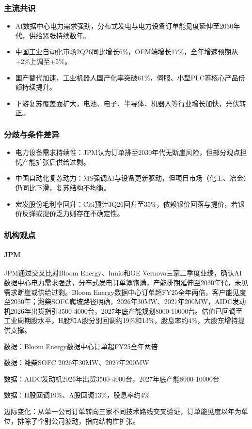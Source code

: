 \documentclass[11pt]{ctexart}
\begin{document}
\subsubsection*{主流共识}
\begin{itemize}
  \item AI数据中心电力需求强劲，分布式发电与电力设备订单能见度延伸至2030年代，供给紧张持续数年。
  \item 中国工业自动化市场2Q26同比增长6\%，OEM端增长17\%，全年增速预期从+2\%上调至+5\%。
  \item 国产替代加速，工业机器人国产化率突破61\%，伺服、小型PLC等核心产品份额持续提升。
  \item 下游复苏覆盖面扩大，电池、电子、半导体、机器人等行业增长加快，光伏转正。
\end{itemize}
\subsubsection*{分歧与条件差异}
\begin{itemize}
  \item 电力设备需求持续性：JPM认为订单排至2030年代无断崖风险，但部分观点担忧产能扩张后供给过剩。
  \item 中国自动化复苏动力：MS强调AI与设备更新驱动，但项目市场（化工、冶金）仍同比下滑，复苏结构不均衡。
  \item 宏发股份毛利率回升：Citi预计3Q26回升至35\%，依赖银价回落与提价，若银价反弹或提价乏力则存在不确定性。
\end{itemize}
\subsubsection*{机构观点}
\paragraph{JPM} JPM通过交叉比对Bloom Energy、Innio和GE Vernova三家二季度业绩，确认AI数据中心电力需求强劲，分布式发电订单簿饱满，产能排期延伸至2030年代，未见需求断崖或供给过剩。Bloom Energy数据中心订单超FY25全年两倍，客户能见度至2030年；潍柴SOFC爬坡路径明确，2026年30MW、2027年200MW，AIDC发动机2026年出货指引3500-4000台，2027年底产能规划8000-10000台。估值已回调至工业周期股水平，H股和A股分别回调约19\%和13\%，股息率约4\%，大股东增持提供支撑。
{\small\color{refgray}数据：Bloom Energy数据中心订单超FY25全年两倍\par}
{\small\color{refgray}数据：潍柴SOFC 2026年30MW、2027年200MW\par}
{\small\color{refgray}数据：AIDC发动机2026年出货3500-4000台，2027年底产能8000-10000台\par}
{\small\color{refgray}数据：H股回调19\%、A股回调13\%，股息率约4\%\par}
{\small\color{refgray}边际变化：从单一公司订单转向三家不同技术路线交叉验证，订单能见度以年为单位，排除了个别公司波动，指向结构性扩张。\par}
\end{document}
